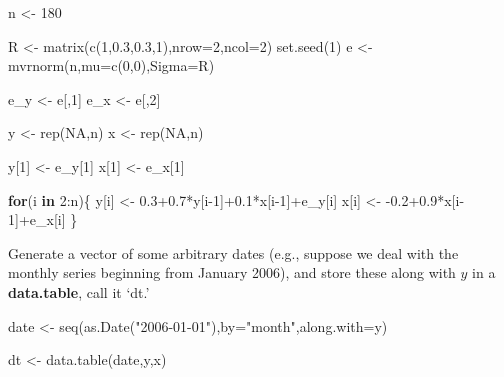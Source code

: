 \documentclass[
  12pt,
  oneside]{book}
\newenvironment{Shaded}{\begin{snugshade}}{\end{snugshade}}
\newcommand{\AttributeTok}[1]{\textcolor[rgb]{0.77,0.63,0.00}{#1}}
\newcommand{\ConstantTok}[1]{\textcolor[rgb]{0.00,0.00,0.00}{#1}}
\newcommand{\ControlFlowTok}[1]{\textcolor[rgb]{0.13,0.29,0.53}{\textbf{#1}}}
\newcommand{\DecValTok}[1]{\textcolor[rgb]{0.00,0.00,0.81}{#1}}
\newcommand{\FloatTok}[1]{\textcolor[rgb]{0.00,0.00,0.81}{#1}}
\newcommand{\FunctionTok}[1]{\textcolor[rgb]{0.00,0.00,0.00}{#1}}
\newcommand{\NormalTok}[1]{#1}
\newcommand{\OtherTok}[1]{\textcolor[rgb]{0.56,0.35,0.01}{#1}}
\newcommand{\SpecialCharTok}[1]{\textcolor[rgb]{0.00,0.00,0.00}{#1}}
\newcommand{\StringTok}[1]{\textcolor[rgb]{0.31,0.60,0.02}{#1}}
\begin{document}
\begin{Shaded}
\begin{Highlighting}[]
\NormalTok{n }\OtherTok{\textless{}{-}} \DecValTok{180}

\NormalTok{R }\OtherTok{\textless{}{-}} \FunctionTok{matrix}\NormalTok{(}\FunctionTok{c}\NormalTok{(}\DecValTok{1}\NormalTok{,}\FloatTok{0.3}\NormalTok{,}\FloatTok{0.3}\NormalTok{,}\DecValTok{1}\NormalTok{),}\AttributeTok{nrow=}\DecValTok{2}\NormalTok{,}\AttributeTok{ncol=}\DecValTok{2}\NormalTok{)}
\FunctionTok{set.seed}\NormalTok{(}\DecValTok{1}\NormalTok{)}
\NormalTok{e }\OtherTok{\textless{}{-}} \FunctionTok{mvrnorm}\NormalTok{(n,}\AttributeTok{mu=}\FunctionTok{c}\NormalTok{(}\DecValTok{0}\NormalTok{,}\DecValTok{0}\NormalTok{),}\AttributeTok{Sigma=}\NormalTok{R)}

\NormalTok{e\_y }\OtherTok{\textless{}{-}}\NormalTok{ e[,}\DecValTok{1}\NormalTok{]}
\NormalTok{e\_x }\OtherTok{\textless{}{-}}\NormalTok{ e[,}\DecValTok{2}\NormalTok{]}

\NormalTok{y }\OtherTok{\textless{}{-}} \FunctionTok{rep}\NormalTok{(}\ConstantTok{NA}\NormalTok{,n)}
\NormalTok{x }\OtherTok{\textless{}{-}} \FunctionTok{rep}\NormalTok{(}\ConstantTok{NA}\NormalTok{,n)}

\NormalTok{y[}\DecValTok{1}\NormalTok{] }\OtherTok{\textless{}{-}}\NormalTok{ e\_y[}\DecValTok{1}\NormalTok{]}
\NormalTok{x[}\DecValTok{1}\NormalTok{] }\OtherTok{\textless{}{-}}\NormalTok{ e\_x[}\DecValTok{1}\NormalTok{]}

\ControlFlowTok{for}\NormalTok{(i }\ControlFlowTok{in} \DecValTok{2}\SpecialCharTok{:}\NormalTok{n)\{}
\NormalTok{  y[i] }\OtherTok{\textless{}{-}} \FloatTok{0.3+0.7}\SpecialCharTok{*}\NormalTok{y[i}\DecValTok{{-}1}\NormalTok{]}\SpecialCharTok{+}\FloatTok{0.1}\SpecialCharTok{*}\NormalTok{x[i}\DecValTok{{-}1}\NormalTok{]}\SpecialCharTok{+}\NormalTok{e\_y[i]}
\NormalTok{  x[i] }\OtherTok{\textless{}{-}} \SpecialCharTok{{-}}\FloatTok{0.2+0.9}\SpecialCharTok{*}\NormalTok{x[i}\DecValTok{{-}1}\NormalTok{]}\SpecialCharTok{+}\NormalTok{e\_x[i]}
\NormalTok{\}}
\end{Highlighting}
\end{Shaded}

Generate a vector of some arbitrary dates (e.g., suppose we deal with the monthly series beginning from January 2006), and store these along with \(y\) in a \textbf{data.table}, call it `dt.'

\begin{Shaded}
\begin{Highlighting}[]
\NormalTok{date }\OtherTok{\textless{}{-}} \FunctionTok{seq}\NormalTok{(}\FunctionTok{as.Date}\NormalTok{(}\StringTok{"2006{-}01{-}01"}\NormalTok{),}\AttributeTok{by=}\StringTok{"month"}\NormalTok{,}\AttributeTok{along.with=}\NormalTok{y)}

\NormalTok{dt }\OtherTok{\textless{}{-}} \FunctionTok{data.table}\NormalTok{(date,y,x)}
\end{Highlighting}
\end{Shaded}
\end{document}
